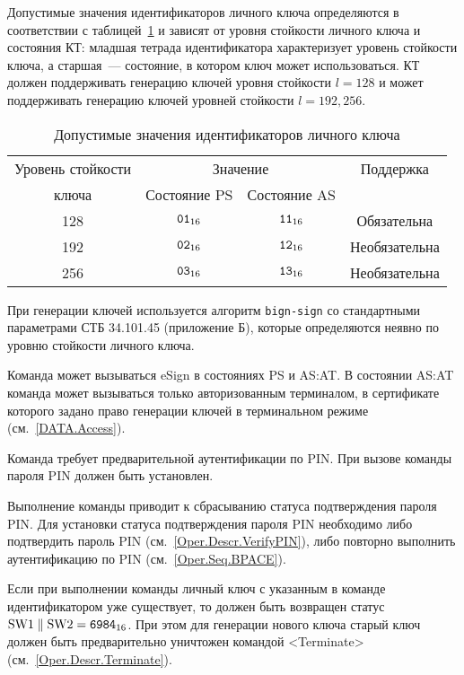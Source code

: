Допустимые значения идентификаторов личного ключа определяются
в соответствии с таблицей~\ref{Table.Oper.KeyRef} и зависят от
уровня стойкости личного ключа и состояния КТ:
младшая тетрада идентификатора характеризует уровень стойкости ключа,
а старшая~--- состояние, в котором ключ может использоваться.
КТ должен поддерживать генерацию ключей уровня стойкости 
$l=128$ и может поддерживать генерацию ключей 
уровней стойкости $l=192,256$.

\begin{table}[hbt]
\caption{Допустимые значения идентификаторов личного ключа}
\label{Table.Oper.KeyRef}
\begin{tabular}{|c|c|c|c|}
\hline
Уровень стойкости & \multicolumn{2}{|c|}{Значение } & Поддержка\\
\cline{2-3}
ключа & Состояние PS & Состояние AS & \\
\hline
\hline
128 & $\texttt{01}_{16}$ & $\texttt{11}_{16}$ & Обязательна \\
192 & $\texttt{02}_{16}$ & $\texttt{12}_{16}$ & Необязательна\\
256 & $\texttt{03}_{16}$ & $\texttt{13}_{16}$ & Необязательна\\
\hline
\end{tabular}
\end{table}

При генерации ключей используется алгоритм \texttt{bign-sign}
со стандартными параметрами СТБ 34.101.45 (приложение Б), 
которые определяются неявно по уровню стойкости личного ключа. 

Команда может вызываться  eSign в состояниях 
PS и AS:AT. В состоянии AS:AT команда может вызываться 
только авторизованным терминалом, в сертификате которого задано право
генерации ключей в терминальном режиме (см.~\ref{DATA.Access}).

Команда требует предварительной аутентификации по PIN. При вызове
команды  пароля PIN должен быть 
установлен.

Выполнение команды приводит к сбрасыванию статуса подтверждения пароля PIN.
Для установки статуса подтверждения пароля PIN 
необходимо либо подтвердить пароль PIN (см.~\ref{Oper.Descr.VerifyPIN}), 
либо повторно выполнить аутентификацию по PIN (см.~\ref{Oper.Seq.BPACE}).

Если при выполнении команды личный ключ с указанным в команде идентификатором
уже существует, то должен быть возвращен статус 
$\text{SW1} \parallel \text{SW2} = \texttt{6984}_{16}$. 
При этом для генерации нового ключа старый ключ должен быть предварительно 
уничтожен командой <Terminate> (см.~\ref{Oper.Descr.Terminate}).

